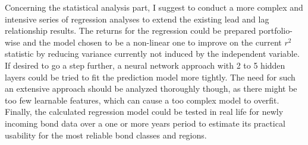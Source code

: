 Concerning the statistical analysis part, I suggest to conduct a more complex and intensive series of regression analyses to extend the existing lead and lag relationship results. The returns for the regression could be prepared portfolio-wise and the model chosen to be a non-linear one to improve on the current $r^2$ statistic by reducing variance currently not induced by the independent variable. If desired to go a step further, a neural network approach with 2 to 5 hidden layers could be tried to fit the prediction model more tightly. The need for such an extensive approach should be analyzed thoroughly though, as there might be too few learnable features, which can cause a too complex model to overfit. Finally, the calculated regression model could be tested in real life for newly incoming bond data over a one or more years period to estimate its practical usability for the most reliable bond classes and regions. 